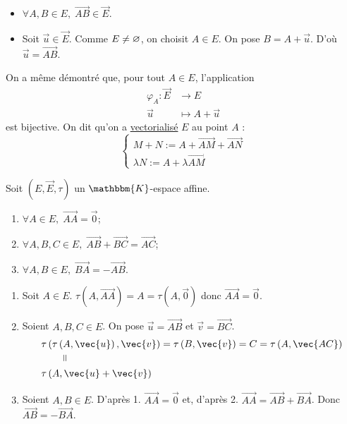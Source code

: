\begin{prv}
	\begin{itemize}
		\item $\forall A, B \in E,\;\vec{AB} \in \vec{E}$.
		\item Soit $\vec{u} \in \vec{E}$. Comme $E \neq \varnothing$, on choisit $A \in E$. On pose $B = A + \vec{u}$. D'où $\vec{u} = \vec{AB}$.
	\end{itemize}
\end{prv}

\begin{rmk}
	On a même démontré que, pour tout $A \in E$, l'application \begin{align*}
		\varphi_A: \vec{E} &\longrightarrow E \\
		\vec{u} &\longmapsto A + \vec{u}
	\end{align*} est bijective. On dit qu'on a \underline{vectorialisé} $E$ au point $A$ : \[
		\begin{cases}
			M + N := A + \vec{AM} + \vec{AN}\\
			\lambda N := A + \lambda \vec{AM}
		\end{cases}
	\]
\end{rmk}

\begin{prop}
	Soit $\left( E, \vec{E}, \tau \right)$ un $\mathbbm{K}$-espace affine.
	\begin{enumerate}
		\item $\forall A \in E,\; \vec{AA} = \vec{0}$;
		\item $\forall A,B,C \in E,\;\vec{AB} + \vec{BC} = \vec{AC}$;
		\item $\forall A,B \in E,\; \vec{BA} = -\vec{AB}$.
	\end{enumerate}
\end{prop}

\begin{prv}
	\begin{enumerate}
		\item Soit $A \in E$. $\tau\left( A, \vec{AA} \right) = A = \tau\left( A, \vec{0} \right)$ donc $\vec{AA} = \vec{0}$.
		\item Soient $A, B, C \in E$. On pose $\vec{u} = \vec{AB}$ et $\vec{v} = \vec{BC}$.
			\begin{align*}
				&\tau\left( \tau\left( A, \vec{u} \right), \vec{v} \right) = \tau\left( B, \vec{v} \right) = C = \tau\left( A, \vec{AC} \right)\\
				&\kern 8mm\vrt=\\
				&\tau\left(A, \vec{u} + \vec{v}\right)\\
			\end{align*}
		\item Soient $A, B \in E$. D'après 1. $\vec{AA} = \vec{0}$ et, d'après 2. $\vec{AA} = \vec{AB} + \vec{BA}$. Donc $\vec{AB} = -\vec{BA}$.
	\end{enumerate}
\end{prv}

